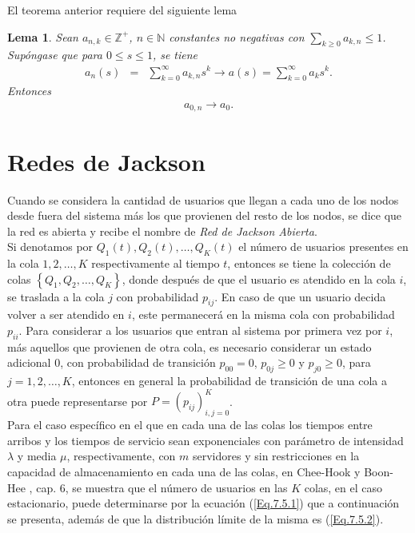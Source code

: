 \documentclass{article}
\newtheorem{Lemma}{Lema}[section]
\newcommand{\nat}{\mathbb{N}}
\newcommand{\ent}{\mathbb{Z}}
\numberwithin{equation}{section}
\begin{document}
El teorema anterior requiere del siguiente lema

\begin{Lemma}
Sean $a_{n,k}\in\ent^{+}$, $n\in\nat$ constantes no negativas con $\sum_{k\geq0}a_{k,n}\leq1$. Sup\'ongase que para $0\leq s\leq1$,
se tiene
\begin{eqnarray*}
a_{n}\left(s\right)&=&\sum_{k=0}^{\infty}a_{k,n}s^{k}\rightarrow
a\left(s\right)=\sum_{k=0}^{\infty}a_{k}s^{k}.
\end{eqnarray*}
Entonces
\begin{eqnarray*}
a_{0,n}\rightarrow a_{0}.
\end{eqnarray*}
\end{Lemma}


\section{Redes de Jackson}
Cuando se considera la cantidad de
usuarios que llegan a cada uno de los nodos desde fuera del
sistema m\'as los que provienen del resto de los nodos, se dice
que la red es abierta y recibe el nombre de {\em Red de Jackson Abierta}.\\

Si denotamos por $Q_{1}\left(t\right),Q_{2}\left(t\right),\ldots,Q_{K}\left(t\right)$ el n\'umero de usuarios presentes en la cola $1,2,\ldots,K$ respectivamente al tiempo $t$, entonces se tiene la colecci\'on de colas $\left\{Q_{1},Q_{2},\ldots,Q_{K}\right\}$, donde despu\'es de que el usuario es atendido en la cola $i$, se traslada a la cola $j$ con probabilidad $p_{ij}$. En caso de que un usuario decida volver a ser atendido en $i$, este permanecer\'a en la misma cola con probabilidad $p_{ii}$. Para considerar a los usuarios que entran al sistema por primera vez por $i$, m\'as aquellos que provienen de otra cola, es necesario considerar un estado adicional $0$, con probabilidad de transici\'on $p_{00}=0$, $p_{0j}\geq0$ y $p_{j0}\geq0$, para $j=1,2,\ldots,K$, entonces en general la probabilidad de transici\'on de una cola a otra puede representarse por $P=\left(p_{ij}\right)_{i,j=0}^{K}$.\\

Para el caso espec\'ifico en el que en cada una de las colas los tiempos entre arribos y los tiempos de servicio sean exponenciales con par\'ametro de intensidad $\lambda$ y media $\mu$, respectivamente, con $m$ servidores y sin restricciones en la capacidad de almacenamiento en cada una de las colas, en Chee-Hook y Boon-Hee \cite{HookHee}, cap. 6, se muestra que el n\'umero de
usuarios en las $K$ colas, en el caso estacionario, puede determinarse por la ecuaci\'on (\ref{Eq.7.5.1})  que a
continuaci\'on se presenta, adem\'as de que la distribuci\'on l\'imite de la misma es (\ref{Eq.7.5.2}).\\
\end{document}
